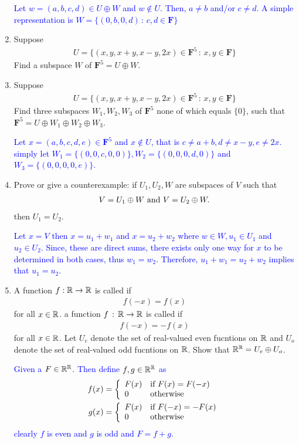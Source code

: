 \documentclass[10pt,a4paper]{report}
\newcommand{\BLUE}[1]{\textcolor{blue}{#1}}
\newcommand{\F}{\textbf{F}}
\begin{document}
\begin{enumerate}
\BLUE{Let $w=(a,b,c,d) \in U \oplus W$ and $w \not \in U$.  Then, $a \ne b$ and/or $c \ne d$. A simple representation is $W =\{(0,b,0,d)\,:\, c,d \in \F \}$
}

\item Suppose 
\begin{align*}
	U=\{(x,y,x+y,x-y,2x) \in \F^5\,:\, x,y\in\F\}
\end{align*}Find a subspace $W$ of $\F^5= U\oplus W$.

\item Suppose
\begin{align*}
	U=\{(x,y,x+y,x-y,2x) \in \F^5\,:\, x,y\in\F\}
\end{align*}  Find three subspaces $W_1, W_2, W_3$ of $\F^5$ none of which equals $\{0\}$, such that $\F^5 = U\oplus W_1\oplus W_2\oplus W_3$.

\BLUE{Let $x = (a,b,c,d,e) \in \F^5$ and $x \not \in U$, that is $c \ne a+b, d \ne x-y, e \ne 2x$.  simply let $W_1=\{(0,0,c,0,0)\}, W_2 = \{(0,0,0,d,0)\}$ and $W_3 = \{(0,0,0,0,e)\}$.
}

\item Prove or give a counterexample: if $U_1,U_2,W$ are subspaces of $V$ such that 
\begin{align*}
	V=U_1\oplus W \text{ and } V=U_2\oplus W.
\end{align*}then $U_1=U_2$.

\BLUE{Let $x = V$ then $x = u_1+w_1$ and $x = u_2+w_2$ where $w \in W, u_1 \in U_1$ and $u_2 \in U_2$.  Since, these are direct sums, there exists only one way for $x$ to be determined in both cases, thus $w_1 = w_2$.  Therefore, $u_1+w_1=u_2+w_2$ implies that $u_1 = u_2$. 
}

\item A function $f: \mathbb{R} \to \mathbb{R}$ is called  if 
\begin{align*}
	f(-x)=f(x)
\end{align*}for all $x \in \mathbb{R}$.  a function $f\,:\, \mathbb{R}\to\mathbb{R}$ is called  if 
\begin{align*}
	f(-x)=-f(x)
\end{align*}for all $x \in \mathbb{R}$.  Let $U_e$ denote the set of real-valued even fucntions on $\mathbb{R}$ and $U_o$ denote the set of real-valued odd fucntions on $\mathbb{R}$.  Show that $\mathbb{R}^{\mathbb{R}}=U_e\oplus U_o$.

\BLUE{Given a $F \in \mathbb{R}^{\mathbb{R}}$.  Then define $f,g\in \mathbb{R}^{\mathbb{R}}$ as
\begin{align*}
	f(x) &=\left \{ \begin{array}{ll} F(x) & \text{if } F(x)=F(-x)\\ 0& \text{otherwise} \end{array} \right .\\
	g(x) &= \left \{ \begin{array}{ll} F(x) & \text{if } F(-x)=-F(x)\\ 0& \text{otherwise} \end{array} \right .
\end{align*}clearly $f$ is even and $g$ is odd and $F=f+g$.
}

\end{enumerate}
\end{document}
